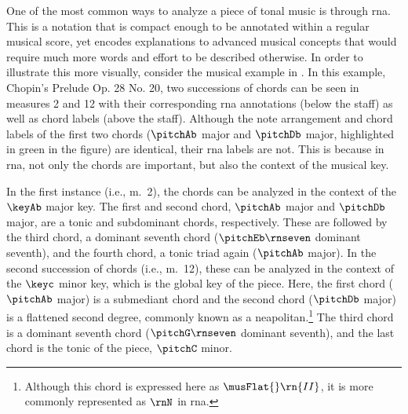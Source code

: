 
One of the most common ways to analyze a piece of tonal
music is through \gls{rna}. This is a notation that is
compact enough to be annotated within a regular musical
score, yet encodes explanations to advanced musical concepts
that would require much more words and effort to be
described otherwise. In order to illustrate this more
visually, consider the musical example in
. In this example, Chopin's
Prelude Op. 28 No. 20, two successions of chords can be seen
in measures 2 and 12 with their corresponding \gls{rna}
annotations (below the staff) as well as chord labels (above
the staff). Although the note arrangement and chord labels
of the first two chords ($\pitchAb$ major and $\pitchDb$
major, highlighted in green in the figure) are identical,
their \gls{rna} labels are not. This is because in
\gls{rna}, not only the chords are important, but also the
context of the musical key.


In the first instance (i.e., m.~2), the chords can be
analyzed in the context of the $\keyAb$ major key. The first
and second chord, $\pitchAb$ major and $\pitchDb$ major, are
a tonic and subdominant chords, respectively. These are
followed by the third chord, a dominant seventh chord
($\pitchEb\rnseven$ dominant seventh), and the fourth chord,
a tonic triad again ($\pitchAb$ major). In the second
succession of chords (i.e., m.~12), these can be analyzed in
the context of the $\keyc$ minor key, which is the global
key of the piece. Here, the first chord ($\pitchAb$ major)
is a submediant chord and the second chord ($\pitchDb$
major) is a flattened second degree, commonly known as a
\gls{neapolitan}.\footnote{Although this chord is expressed
here as $\musFlat{}\rn{II}$, it is more commonly represented
as $\rnN$ in \gls{rna}.} The third chord is a dominant
seventh chord ($\pitchG\rnseven$ dominant seventh), and the
last chord is the tonic of the piece, $\pitchC$ minor.

